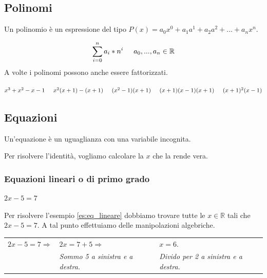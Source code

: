 \subsection*{Polinomi}
\begin{definition}
    Un polinomio è un espressione del tipo $P(x)=a_0x^0+a_1a^1+a_2a^2+...+a_nx^n$.
\end{definition}
\begin{equation}
    \sum_{i=0}^{n}a_i*n^i\hspace{0,5cm}a_0,...,a_n\in\mathbb{R}
\end{equation}
A volte i polinomi possono anche essere fattorizzati.
\begin{example}
    $x^3+x^2-x-1\hspace{0,5cm}x^2(x+1)-(x+1)\hspace{0,5cm}(x^2-1)(x+1)\hspace{0,5cm}(x+1)(x-1)(x+1)\hspace{0,5cm}(x+1)^2(x-1)$
\end{example}

\subsection*{Equazioni}
\begin{definition}
    Un'equazione è un uguaglianza con una variabile incognita.
\end{definition}
Per risolvere l'identità, vogliamo calcolare la $x$ che la rende vera.

\subsubsection*{Equazioni lineari o di primo grado}
\begin{example}\label{es:eq_lineare}
    $2x-5=7$
\end{example}
Per risolvere l'esempio \ref{es:eq_lineare} dobbiamo trovare tutte le $x\in\mathbb{R}$ tali che $2x-5=7$. A tal punto effettuiamo delle manipolazioni algebriche.

\begin{tabular}{c m{3cm} m{3cm}}
     $2x-5=7\Rightarrow$ & $2x=7+5\Rightarrow$ & $x=6$.\\
     & \textit{Sommo 5 a sinistra e a destra.} & \textit{Divido per 2 a sinistra e a destra.}
\end{tabular}

